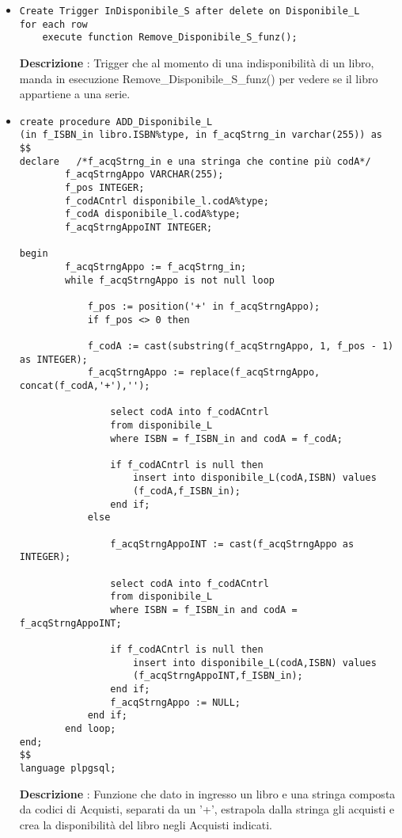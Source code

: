 \begin{itemize}
\item\begin{verbatim}
Create Trigger InDisponibile_S after delete on Disponibile_L
for each row
    execute function Remove_Disponibile_S_funz();
\end{verbatim}
{\bf Descrizione} : Trigger che al momento di una indisponibilità di un libro, manda in esecuzione Remove\_Disponibile\_S\_funz() per vedere se il libro appartiene a una serie.




\item\begin{verbatim}
create procedure ADD_Disponibile_L
(in f_ISBN_in libro.ISBN%type, in f_acqStrng_in varchar(255)) as
$$
declare   /*f_acqStrng_in e una stringa che contine più codA*/
        f_acqStrngAppo VARCHAR(255);
        f_pos INTEGER;
        f_codACntrl disponibile_l.codA%type;
        f_codA disponibile_l.codA%type;
        f_acqStrngAppoINT INTEGER;
	
begin
        f_acqStrngAppo := f_acqStrng_in;
        while f_acqStrngAppo is not null loop
		
            f_pos := position('+' in f_acqStrngAppo);
            if f_pos <> 0 then 
		
            f_codA := cast(substring(f_acqStrngAppo, 1, f_pos - 1) as INTEGER);
            f_acqStrngAppo := replace(f_acqStrngAppo, concat(f_codA,'+'),'');
			
                select codA into f_codACntrl
                from disponibile_L 
                where ISBN = f_ISBN_in and codA = f_codA;

                if f_codACntrl is null then 
                    insert into disponibile_L(codA,ISBN) values 
                    (f_codA,f_ISBN_in);
                end if;
            else
			
                f_acqStrngAppoINT := cast(f_acqStrngAppo as INTEGER);
			
                select codA into f_codACntrl
                from disponibile_L 
                where ISBN = f_ISBN_in and codA = f_acqStrngAppoINT;
			
                if f_codACntrl is null then 
                    insert into disponibile_L(codA,ISBN) values 
                    (f_acqStrngAppoINT,f_ISBN_in);
                end if;
                f_acqStrngAppo := NULL;
            end if;
        end loop;
end;
$$
language plpgsql;
\end{verbatim}
{\bf Descrizione} : Funzione che dato in ingresso un libro e una stringa composta da codici di Acquisti, separati da un '+', estrapola dalla stringa gli acquisti e crea la disponibilità del libro negli Acquisti indicati.



\end{itemize}

